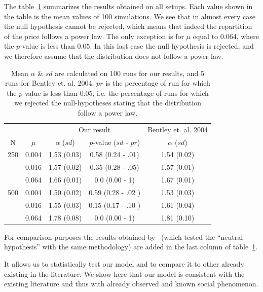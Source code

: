 \documentclass[a4paper]{article}
\begin{document}
The table~\ref{tab:mualpha} summarizes the results obtained on all setups. Each value shown in the table is the mean values of 100 simulations. We see that in almost every case the null hypothesis cannot be rejected, which means that indeed the repartition of the price follows a power law. The only exception is for $\mu$ equal to $0.064$, where the $p$-value is less than $0.05$. In this last case the null hypothesis is rejected, and we therefore assume that the distribution does not follow a power law.

\begin{table}[!h]
	\caption{Mean $\alpha$ \& $sd$ are calculated on 100 runs for our results, and 5 runs for Bentley et. al. 2004. $pr$ is the percentage of run for which the $p$-value is less than 0.05, i.e. the percentage of runs for which we rejected the null-hypotheses stating that the distribution follow a power law.}
	\centering
	\begin{tabular}{cc|ccc}
		\multicolumn{2}{r}{}&\multicolumn{2}{c}{Our result}&\multicolumn{1}{c}{Bentley et. al. 2004}\\
			N&$\mu$ & $\alpha$ ($sd$) & $p$-value ($sd$ - $pr$) &$\alpha$ ($sd$)\\\hline
		250	&0.004&1.53 (0.03)&0.58 (0.24 - .01)&1.54 (0.02)\\
			&0.016&1.57 (0.02)&0.35 (0.28 - .05)&1.57 (0.01)\\
			&0.064&1.66 (0.01)&0.0 (0.00 - 1)&1.67 (0.01)\\\hline
		500	&0.004&1.50 (0.02)&0.59 (0.28 - .02 )&1.53 (0.03)\\
			&0.016&1.55 (0.03)&0.15 (0.17 - .10 )&1.61 (0.04)\\
			&0.064&1.78 (0.08)&0.0 (0.00 - 1)&1.81 (0.10)\\
	\end{tabular}
	\label{tab:mualpha}
\end{table}

For comparison purposes the results obtained by~\cite{bentley_random_2004} (which tested the ``neutral hypothesis'' with the same methodology) are added in the last column of table~\ref{tab:mualpha}. 

It allows us to statistically test our model and to compare it to other already existing in the literature. We show here that our model is consistent with the existing literature and thus with already observed and known social phenomenon.

\end{document}
